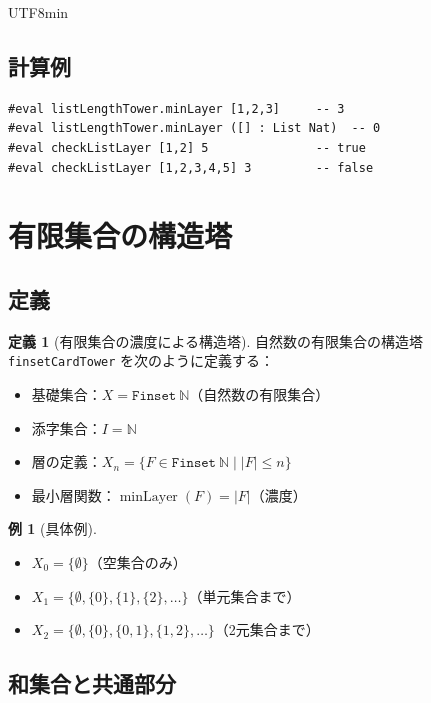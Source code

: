 \documentclass[12pt,a4paper]{article}
\theoremstyle{definition}
\newtheorem{definition}[theorem]{定義}
\newtheorem{example}[theorem]{例}
\theoremstyle{remark}
\newcommand{\N}{\mathbb{N}}
\DeclareMathOperator{\minLayer}{minLayer}
\begin{document}
\begin{CJK}{UTF8}{min}
\subsection{計算例}

\begin{tcolorbox}[title=Lean での実装例]
\begin{verbatim}
#eval listLengthTower.minLayer [1,2,3]     -- 3
#eval listLengthTower.minLayer ([] : List Nat)  -- 0
#eval checkListLayer [1,2] 5               -- true
#eval checkListLayer [1,2,3,4,5] 3         -- false
\end{verbatim}
\end{tcolorbox}

\section{有限集合の構造塔}

\subsection{定義}

\begin{definition}[有限集合の濃度による構造塔]
自然数の有限集合の構造塔 \texttt{finsetCardTower} を次のように定義する：
\begin{itemize}
\item 基礎集合：$X = \texttt{Finset}\ \N$（自然数の有限集合）
\item 添字集合：$I = \N$
\item 層の定義：$X_n = \{F \in \texttt{Finset}\ \N \mid |F| \leq n\}$
\item 最小層関数：$\minLayer(F) = |F|$（濃度）
\end{itemize}
\end{definition}

\begin{example}[具体例]
\begin{itemize}
\item $X_0 = \{\emptyset\}$（空集合のみ）
\item $X_1 = \{\emptyset, \{0\}, \{1\}, \{2\}, \ldots\}$（単元集合まで）
\item $X_2 = \{\emptyset, \{0\}, \{0,1\}, \{1,2\}, \ldots\}$（2元集合まで）
\end{itemize}
\end{example}

\subsection{和集合と共通部分}


\end{CJK}
\end{document}
